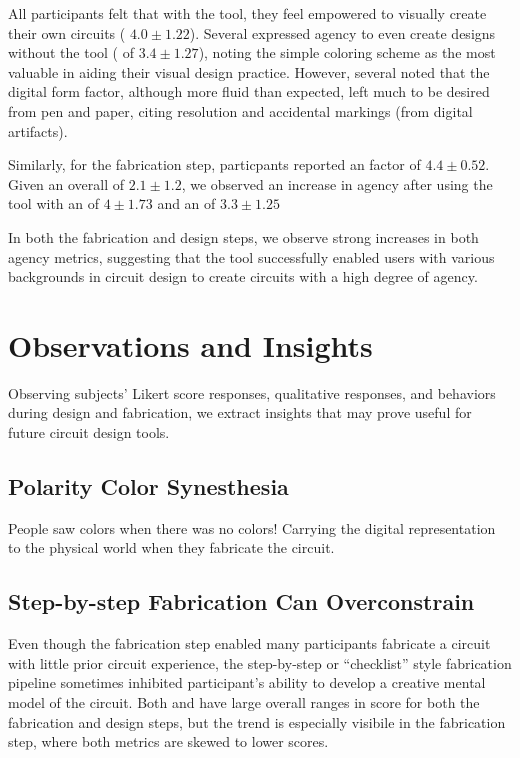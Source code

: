 \documentclass{sigchi}
\begin{document}
  All participants felt that with the tool, they feel empowered to visually create their own circuits ( $4.0 \pm 1.22$). Several expressed agency to even create designs without the tool ( of $3.4 \pm 1.27$), noting the simple coloring scheme as the most valuable in aiding their visual design practice. However, several noted that the digital form factor, although more fluid than expected, left much to be desired from pen and paper, citing resolution and accidental markings (from digital artifacts). 


  Similarly, for the fabrication step, particpants reported an  factor of $4.4 \pm 0.52$. Given an overall  of $2.1 \pm 1.2$, we observed an increase in agency after using the tool with an  of $4 \pm 1.73$ and an  of $3.3 \pm 1.25$

  In both the fabrication and design steps, we observe strong increases in both agency metrics, suggesting that the tool successfully enabled users with various backgrounds in circuit design to create circuits with a high degree of agency.
  
  

\section{Observations and Insights}
  Observing subjects' Likert score responses, qualitative responses, and behaviors during design and fabrication, we extract insights that may prove useful for future circuit design tools.
  
  
  \subsection{Polarity Color Synesthesia}
  People saw colors when there was no colors!
  Carrying the digital representation to the physical world when they fabricate the circuit. 

  \subsection{Step-by-step Fabrication Can Overconstrain}

  Even though the fabrication step enabled many participants fabricate a circuit with little prior circuit experience, the step-by-step or ``checklist'' style fabrication pipeline sometimes inhibited participant's ability to develop a creative mental model of the circuit. Both  and  have large overall ranges in score for both the fabrication and design steps, but the trend is especially visibile in the fabrication step, where both  metrics are skewed to lower scores.
  
\end{document}
